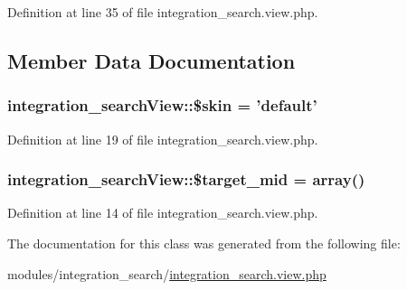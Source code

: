 Definition at line 35 of file integration\+\_\+search.\+view.\+php.



\subsection{Member Data Documentation}
\hypertarget{classintegration__searchView_a4281fc0752039ec4025ddaca5771f074}{
\subsubsection[{\$skin}]{\setlength{\rightskip}{0pt plus 5cm}integration\+\_\+search\+View\+::\$skin = 'default'}}\label{classintegration__searchView_a4281fc0752039ec4025ddaca5771f074}


Definition at line 19 of file integration\+\_\+search.\+view.\+php.

\hypertarget{classintegration__searchView_a17efafd7259acddb90e2c181bcfeaa38}{
\subsubsection[{\$target\+\_\+mid}]{\setlength{\rightskip}{0pt plus 5cm}integration\+\_\+search\+View\+::\$target\+\_\+mid = array()}}\label{classintegration__searchView_a17efafd7259acddb90e2c181bcfeaa38}


Definition at line 14 of file integration\+\_\+search.\+view.\+php.



The documentation for this class was generated from the following file\+:\begin{DoxyCompactItemize}
\item 
modules/integration\+\_\+search/\hyperlink{integration__search_8view_8php}{integration\+\_\+search.\+view.\+php}\end{DoxyCompactItemize}
